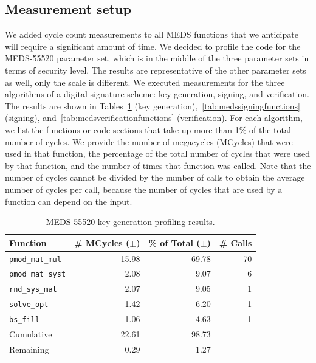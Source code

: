 \documentclass[11pt,a4paper]{report}
\theoremstyle{definition}
\begin{document}
\subsection{Measurement setup}
We added cycle count measurements to all MEDS functions that we anticipate will require a significant amount of time. We decided to profile the code for the MEDS-55520 parameter set, which is in the middle of the three parameter sets in terms of security level. The results are representative of the other parameter sets as well, only the scale is different. We executed measurements for the three algorithms of a digital signature scheme: key generation, signing, and verification. The results are shown in Tables~\ref{tab:medskeygenfunctions} (key generation),~\ref{tab:medssigningfunctions} (signing), and~\ref{tab:medsverificationfunctions} (verification). For each algorithm, we list the functions or code sections that take up more than 1\% of the total number of cycles. We provide the number of megacycles (MCycles) that were used in that function, the percentage of the total number of cycles that were used by that function, and the number of times that function was called. Note that the number of cycles cannot be divided by the number of calls to obtain the average number of cycles per call, because the number of cycles that are used by a function can depend on the input.

\begin{table}
  \centering
  \caption{MEDS-55520 key generation profiling results.}
  \begin{tabular}{lrrr}
    \toprule
    \textbf{Function}        & \textbf{\# MCycles} ($\pm$) & \textbf{\% of Total} ($\pm$) & \textbf{\# Calls} \\
    \midrule
    \texttt{pmod\_mat\_mul}  & 15.98                       & 69.78                        & 70                \\
    \texttt{pmod\_mat\_syst} & 2.08                        & 9.07                         & 6                 \\
    \texttt{rnd\_sys\_mat}   & 2.07                        & 9.05                         & 1                 \\
    \texttt{solve\_opt}      & 1.42                        & 6.20                         & 1                 \\
    \texttt{bs\_fill}        & 1.06                        & 4.63                         & 1                 \\
    \midrule
    Cumulative               & 22.61                       & 98.73                        &                   \\
    Remaining                & 0.29                        & 1.27                         &                   \\
    \bottomrule
  \end{tabular}
  \label{tab:medskeygenfunctions}
\end{table}
\end{document}
